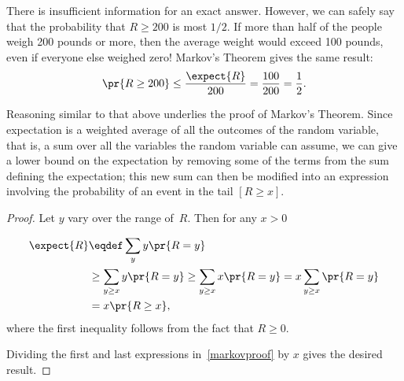 \begin{editingnotes}
There is insufficient information for an exact answer.  However, we
can safely say that the probability that $R \geq 200$ is most
$1/2$.  If more than half of the people weigh 200 pounds or
more, then the average weight would exceed 100 pounds, even if
everyone else weighed zero!  Markov's Theorem gives the same result:
\begin{displaymath}
  \pr{R \geq 200} \leq \frac{\expect{R}}{200} = \frac{100}{200} = \frac{1}{2}.
\end{displaymath}

Reasoning similar to that above underlies the proof of Markov's
Theorem.  Since expectation is a weighted average of all the outcomes
of the random variable, that is, a sum over all the variables the random
variable can assume, we can give a lower bound on the expectation by
removing some of the terms from the sum defining the expectation; this
new sum can then be modified into an expression involving the
probability of an event in the tail $[R \geq x]$.

\end{editingnotes}

\begin{proof}%
Let $y$ vary over the range of~$R$.  Then for any $x > 0$

\iffalse
\begin{align}
  \expect{R}
  & = \expcond{R}{R < x}\pr{R<x} + \expcond{R}{R \geq x}\pr{R \geq x}
       & \text{(total expectation)}\notag\\
  & \geq \expcond{R}{R \geq x}\pr{R \geq x}
       & \text{(because $R \geq 0$)}\notag\\
  & \geq x \pr{R \geq x}.\label{markovproof}
\end{align}
\fi
\iffalse

\begin{align}
  \expect{R}
  & \eqdef \sum_{y} y\pr{R=y}\notag\\
  & \geq \sum_{y \geq x} y\pr{R=y} & \text{(because $R \geq 0$)}\notag\\
  & \geq \sum_{y \geq x} x\pr{R=y}\notag\\
  & = x \sum_{y \geq x} \pr{R=y}\notag\\
  & = x \pr{R \geq x}.\label{markovproof}
\end{align}
\fi

\begin{align}
  \expect{R}
   & \eqdef \sum_{y} y\pr{R=y}\notag\\
   & \geq \sum_{y \geq x} y\pr{R=y}
     \geq \sum_{y \geq x} x\pr{R=y}
      = x \sum_{y \geq x} \pr{R=y}\notag\\
  & = x \pr{R \geq x},\label{markovproof}
\end{align}
where the first inequality follows from the fact that $R \geq 0$.

Dividing the first and last expressions in~\eqref{markovproof} by $x$
gives the desired result.
\end{proof}

